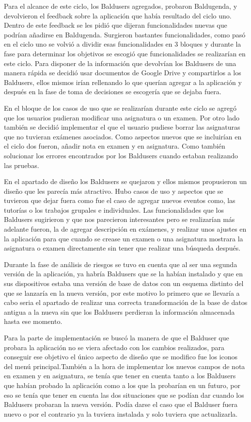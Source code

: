 Para el alcance de este ciclo, los Baldusers agregados, probaron Baldugenda, y devolvieron el feedback sobre la aplicación que había resultado del ciclo uno. Dentro de este feedback se les pidió que dijeran funcionalidades nuevas que podrían añadirse en Baldugenda. Surgieron bastantes funcionalidades, como pasó en el ciclo uno se volvió a dividir esas funcionalidades en 3 bloques y durante la fase para determinar los objetivos se escogió que funcionalidades se realizarían en este ciclo.
Para disponer de la información que devolvían los Baldusers de una manera rápida se decidió usar documentos de Google Drive y compartirlos a los Baldusers, ellos mismos irían rellenando lo que querían agregar a la aplicación y después en la fase de toma de decisiones se escogería que se dejaba fuera.

En el bloque de los casos de uso que se realizarían durante este ciclo se agregó que los usuarios pudieran modificar una asignatura o un examen. Por otro lado también se decidió implementar el que el usuario pudiese borrar las asignaturas que no tuvieran exámenes asociados. Como aspectos nuevos que se incluirían en el ciclo dos fueron, añadir nota en examen y en asignatura. Como también solucionar los errores encontrados por los Baldusers cuando estaban realizando las pruebas.

En el apartado de diseño los Baldusers se quejaron y ellos mismos propusieron un diseño que les parecía más atractivo.
Hubo casos de uso y aspectos que se tuvieron que dejar fuera como fue el caso de agregar nuevos eventos como, las tutorías o los trabajos grupales e individuales.
Las funcionalidades que los Baldusers sugirieron y que nos parecieron interesantes pero se realizarían más adelante fueron, la de agregar descripción en exámenes, y realizar unos ajustes en la aplicación para que cuando se crease un examen o una asignatura mostrara la asignatura o examen directamente sin tener que realizar una búsqueda después.

Durante la fase de análisis de riesgos se tuvo en cuenta que al ser una segunda versión de la aplicación, ya habría Baldusers que se la habían instalado y que en sus dispositivos estaba una versión de base de datos con un esquema distinto del que se lanzaría en la nueva versión, por este motivo lo primero que se llevaría a cabo seria el apartado de realizar una correcta transformación de la base de datos antigua a la nueva sin que los Baldusers perdieran la información almacenada hasta ese momento.

Para la parte de implementación se buscó la manera de que el Balduser que probara la aplicación no se viera afectado con los cambios realizados, para conseguir ese objetivo el único aspecto de diseño que se modifico fue los iconos del menú principal.También a la hora de implementar los nuevos campos de nota en examen y en asignatura, se tenía que tener en cuenta tanto a los Baldusers que habían probado la aplicación como a los que la probarían en un futuro, por eso se tenía que tener en cuenta las dos situaciones que se podían dar cuando los Baldusers probaran la nueva versión. Podía darse el caso que el Balduser fuera nuevo o por el contrario ya la tuviera instalada y solo tuviera que actualizarla.

